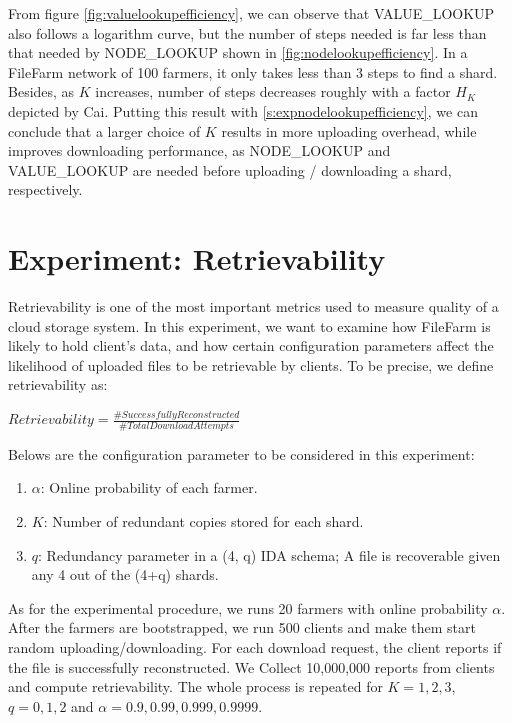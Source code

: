 From figure \ref{fig:valuelookupefficiency}, we can observe that VALUE\_LOOKUP also follows a logarithm curve, but the number of steps needed is far less than that needed by NODE\_LOOKUP shown in \ref{fig:nodelookupefficiency}. In a FileFarm network of 100 farmers, it only takes less than 3 steps to find a shard. Besides, as $K$ increases, number of steps decreases roughly with a factor $H_{K}$ depicted by Cai\cite{cai2013probabilistic}. Putting this result with \ref{s:expnodelookupefficiency}, we can conclude that a larger choice of $K$ results in more uploading overhead, while improves downloading performance, as NODE\_LOOKUP and VALUE\_LOOKUP are needed before uploading / downloading a shard, respectively.

\section{Experiment: Retrievability}
\label{s:expretrievability}

Retrievability is one of the most important metrics used to measure quality of a cloud storage system. In this experiment, we want to examine how FileFarm is likely to hold client's data, and how certain configuration parameters affect the likelihood of uploaded files to be retrievable by clients. To be precise, we define retrievability as:

\begin{center}
  $Retrievability = \frac{\# Successfully Reconstructed}{\# Total Download Attempts}$
\end{center}

\noindent Belows are the configuration parameter to be considered in this experiment:

\begin{enumerate}
  \item $\alpha$: Online probability of each farmer.
  \item $K$: Number of redundant copies stored for each shard.
  \item $q$: Redundancy parameter in a (4, q) IDA schema; A file is recoverable given any 4 out of the (4+q) shards.
\end{enumerate}

As for the experimental procedure, we runs 20 farmers with online probability $\alpha$. After the farmers are bootstrapped, we run 500 clients and make them start random uploading/downloading. For each download request, the client reports if the file is successfully reconstructed. We Collect 10,000,000 reports from clients and compute retrievability. The whole process is repeated for $K=1,2,3$, $q=0,1,2$ and $\alpha=0.9,0.99,0.999,0.9999$.


